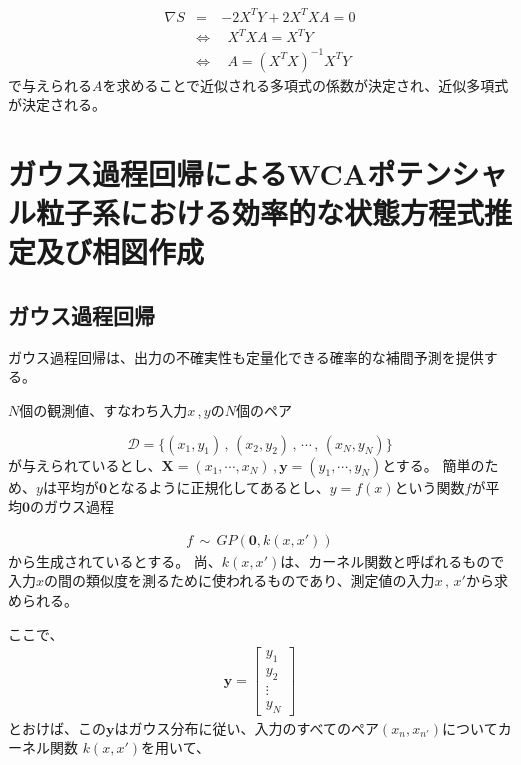 \documentclass[titlepage]{jsreport}
\begin{document}
{{{\large
\begin{eqnarray}
    {\nabla}S&=&-2X^TY+2X^TXA=0\nonumber\\
    &{\Leftrightarrow}&{\ }{\ }X^TXA=X^TY\nonumber\\
    &{\Leftrightarrow}&{\ }{\ }A=(X^TX)^{-1}X^TY\label{eq:normal-equation}
\end{eqnarray}
\normalsize
で与えられる$A$を求めることで近似される多項式の係数が決定され、近似多項式が決定される\cite{least-squares}。



\section{ガウス過程回帰によるWCAポテンシャル粒子系における効率的な状態方程式推定及び相図作成}\label{method-sec:Gauss}


\subsection{ガウス過程回帰}\label{method-subsec:Gauss}
ガウス過程回帰は、出力の不確実性も定量化できる確率的な補間予測を提供する\cite{machine-learning}。


$N$個の観測値、すなわち入力$x$\,,\,$y$の$N$個のペア

\large
\[
    \mathcal{D}=\{(x_1,y_1)\,,\,(x_2,y_2)\,,\,\cdots\,,\,(x_N,y_N)\}
\]
\normalsize
が与えられているとし、$\bm{X}=(x_1,\cdots,x_N)$\,,\,$\bm{y}=(y_1,\cdots,y_N)$とする。
簡単のため、$y$は平均が$\bm{0}$となるように正規化してあるとし、$y=f(x)$という関数$f$が平均$\bm{0}$のガウス過程

\large
\begin{eqnarray}
    f\,{\sim}\,GP(\bm{0},k(x,x'))\nonumber
\end{eqnarray}
\normalsize
から生成されているとする。
尚、$k(x,x')$は、カーネル関数と呼ばれるもので入力$x$の間の類似度を測るために使われるものであり\cite{Gauss-machine-learning}、測定値の入力$x\,,\,x'$から求められる。

ここで、
\large
\begin{eqnarray}
\bm{y}=  
    \left[
        \begin{array}{c}
        y_1\\
        y_2\\
        \vdots\\
        y_N
        \end{array}
    \right] \nonumber
\end{eqnarray}
\normalsize
とおけば、この$\bm{y}$はガウス分布に従い、入力のすべてのペア$(x_n,x_{n'})$についてカーネル関数
$k(x,x')$を用いて、

}}}
\end{document}
